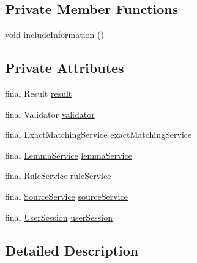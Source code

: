 \subsection*{Private Member Functions}
\begin{DoxyCompactItemize}
\item 
void \hyperlink{classbr_1_1usp_1_1cata_1_1web_1_1controller_1_1_rules_controller_a16a05dad9085b15a5e3833e274462ec4}{include\+Information} ()
\end{DoxyCompactItemize}
\subsection*{Private Attributes}
\begin{DoxyCompactItemize}
\item 
final Result \hyperlink{classbr_1_1usp_1_1cata_1_1web_1_1controller_1_1_rules_controller_a8e45948e75f80863ff4e806d5e65b812}{result}
\item 
final Validator \hyperlink{classbr_1_1usp_1_1cata_1_1web_1_1controller_1_1_rules_controller_ad401152db4ca88b16db6af85f197c9e2}{validator}
\item 
final \hyperlink{classbr_1_1usp_1_1cata_1_1service_1_1_exact_matching_service}{Exact\+Matching\+Service} \hyperlink{classbr_1_1usp_1_1cata_1_1web_1_1controller_1_1_rules_controller_a1d0b9b9de5f7ab54667cce7cf063ea5c}{exact\+Matching\+Service}
\item 
final \hyperlink{classbr_1_1usp_1_1cata_1_1service_1_1_lemma_service}{Lemma\+Service} \hyperlink{classbr_1_1usp_1_1cata_1_1web_1_1controller_1_1_rules_controller_a0d64ae4445b5f08567a759ac878fd46c}{lemma\+Service}
\item 
final \hyperlink{classbr_1_1usp_1_1cata_1_1service_1_1_rule_service}{Rule\+Service} \hyperlink{classbr_1_1usp_1_1cata_1_1web_1_1controller_1_1_rules_controller_a44a989236fbd708f51daf982a6612e3f}{rule\+Service}
\item 
final \hyperlink{classbr_1_1usp_1_1cata_1_1service_1_1_source_service}{Source\+Service} \hyperlink{classbr_1_1usp_1_1cata_1_1web_1_1controller_1_1_rules_controller_a0bdfd02330463311f5f1d872ed2a5825}{source\+Service}
\item 
final \hyperlink{classbr_1_1usp_1_1cata_1_1web_1_1controller_1_1_user_session}{User\+Session} \hyperlink{classbr_1_1usp_1_1cata_1_1web_1_1controller_1_1_rules_controller_aa92287f4621059a80c592dde106e3b3b}{user\+Session}
\end{DoxyCompactItemize}


\subsection{Detailed Description}


